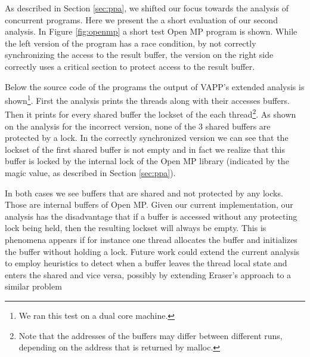 As described in Section \ref{sec:ppa}, we shifted our focus towards
the analysis of concurrent programs. Here we present the
a short evaluation of our second analysis. In Figure \ref{fig:openmp}
a short test Open MP program is shown. While the left version of the
program has a race condition, by not correctly synchronizing the access
to the result buffer, the version on the right side correctly uses a
critical section to protect access to the result buffer.

Below the source code of the programs the output of VAPP's extended
analysis is shown\footnote{We ran this test on a dual core
  machine.}. First the analysis prints the threads along with their
accesses buffers. Then it prints for every shared buffer the
lockset of the each thread\footnote{Note that the addresses of the
  buffers may differ between different runs, depending on the address
  that is returned by malloc.}. As shown on the analysis for the
incorrect version, none of the 3 shared buffers are protected by a
lock. In the correctly synchronized version we can see that the
lockset of the first shared buffer is not empty and in fact we realize
that this buffer is locked by the internal lock of the Open MP library
(indicated by the magic value, as described in Section \ref{sec:ppa}).

In both cases we see buffers that are shared and not protected by any
locks. Those are internal buffers of Open MP. Given our current
implementation, our analysis has the disadvantage that
if a buffer is accessed without any protecting lock being held, then
the resulting lockset will always be empty. This is phenomena appears
if for instance one thread allocates the buffer and initializes the
buffer without holding a lock. Future work could extend the current
analysis to employ heuristics to detect when a buffer leaves the
thread local state and enters the shared and vice versa, possibly by
extending Eraser's approach to a similar problem \cite{savage1997eraser}



